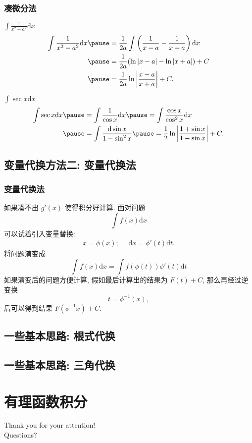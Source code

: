 \documentclass[
10pt,
aspectratio=43,
]{beamer}
\begin{document}
\begin{frame}
	\frametitle{凑微分法}
	\everymath{\displaystyle}
	\begin{exampleblock}{$\int \frac{1}{x^2-a^2} \mathrm{d}x$}
		$$
		\begin{aligned}
			\int \frac{1}{x^2-a^2} \mathrm{d}x   & \pause  = \frac{1}{2a} \int \left(\frac{1}{x-a}-\frac{1}{x+a}\right) \mathrm{d}x   \\
			& \pause = \frac{1}{2a}(\ln |x-a|-\ln |x+a|)+C \\
			& \pause  = \frac{1}{2a} \ln \left|\frac{x-a}{x+a}\right|+C.
		\end{aligned}
		$$
	\end{exampleblock}
	\pause 
	\begin{exampleblock}{$\int \sec x \mathrm{d}x$}
		$$
		\begin{aligned}
			\int \sec x \mathrm{d}x   & \pause  = \int \frac{1}{\cos x} \mathrm{d}x \pause  = \int \frac{\cos x}{\cos^2 x} \mathrm{d}x   \\
			& \pause = \int \frac{\mathrm{d}\sin x}{1-\sin^2 x} \pause  = \frac{1}{2} \ln \left|\frac{1+\sin x}{1-\sin x}\right|+C.
		\end{aligned}
		$$
	\end{exampleblock}
\end{frame}

\subsection{变量代换方法二: 变量代换法}

\begin{frame}
	\frametitle{变量代换法}
	\everymath{\displaystyle}
	如果凑不出 $g'(x)$ 使得积分好计算. 
	面对问题
	$$
		\int f(x)\mathrm{d}x
	$$
	可以试着引入变量替换:
	$$
		\begin{aligned}
			x=\phi(x);\,\,\,\, \,\,\,\,\mathrm{d}x=\phi'(t)\mathrm{d}t.
		\end{aligned}
	$$
	将问题演变成
	$$
		\int f(x)\mathrm{d}x=\int f(\phi(t))\phi'(t)\mathrm{d}t 
	$$
	如果演变后的问题方便计算, 假如最后计算出的结果为 $F(t)+C$, 那么再经过逆变换
	$$
		t=\phi^{-1}(x),
	$$
	后可以得到结果 $F(\phi^{-1}x)+C$.
\end{frame}

\subsection{一些基本思路: 根式代换}

\subsection{一些基本思路: 三角代换}

\section{有理函数积分}

\begin{frame}[plain]
	\vfill
	\centering
	{
		\centering \Huge \color{white} Thank you for your attention!\\[10pt]Questions?
	}
	\vfill
\end{frame}
\end{document}
